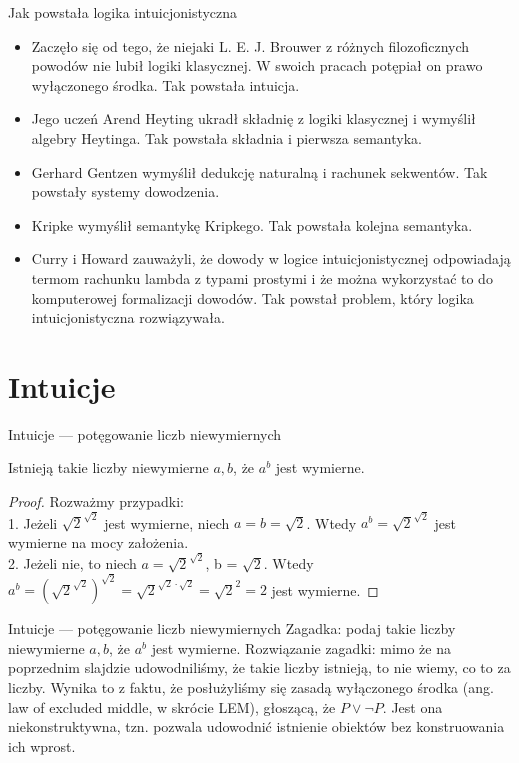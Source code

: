 \documentclass{beamer}
\begin{document}
\begin{frame}{Jak powstała logika intuicjonistyczna}
\begin{itemize}
	\item Zaczęło się od tego, że niejaki L. E. J. Brouwer z różnych filozoficznych powodów nie lubił logiki klasycznej. W swoich pracach potępiał on prawo wyłączonego środka. Tak powstała intuicja.
	\item Jego uczeń Arend Heyting ukradł składnię z logiki klasycznej i wymyślił algebry Heytinga. Tak powstała składnia i pierwsza semantyka.
	\item Gerhard Gentzen wymyślił dedukcję naturalną i rachunek sekwentów. Tak powstały systemy dowodzenia.
	\item Kripke wymyślił semantykę Kripkego. Tak powstała kolejna semantyka.
	\item Curry i Howard zauważyli, że dowody w logice intuicjonistycznej odpowiadają termom rachunku lambda z typami prostymi i że można wykorzystać to do komputerowej formalizacji dowodów. Tak powstał problem, który logika intuicjonistyczna rozwiązywała.
\end{itemize}
\end{frame}

\section{Intuicje}

\begin{frame}{Intuicje — potęgowanie liczb niewymiernych}
\begin{theorem}
Istnieją takie liczby niewymierne $a, b$, że $a^b$ jest wymierne.
\end{theorem}
\begin{proof}
Rozważmy przypadki: \\
1. Jeżeli $\sqrt{2}^{\sqrt{2}}$ jest wymierne, niech $a = b = \sqrt{2}$. Wtedy $a^b = \sqrt{2}^{\sqrt{2}}$ jest wymierne na mocy założenia. \\
2. Jeżeli nie, to niech $a = \sqrt{2}^{\sqrt{2}}$, b = $\sqrt{2}$. Wtedy $a^b = (\sqrt{2}^{\sqrt{2}})^{\sqrt{2}} = \sqrt{2}^{\sqrt{2} \cdot \sqrt{2}} = \sqrt{2}^2 = 2$ jest wymierne.
\end{proof}
\end{frame}

\begin{frame}{Intuicje — potęgowanie liczb niewymiernych}
Zagadka: podaj takie liczby niewymierne $a, b$, że $a^b$ jest wymierne.
Rozwiązanie zagadki: mimo że na poprzednim slajdzie udowodniliśmy, że takie liczby istnieją, to nie wiemy, co to za liczby. Wynika to z faktu, że posłużyliśmy się zasadą wyłączonego środka (ang. law of excluded middle, w skrócie LEM), głoszącą, że $P \lor \neg P$. Jest ona niekonstruktywna, tzn. pozwala udowodnić istnienie obiektów bez konstruowania ich wprost.
\end{frame}
\end{document}
